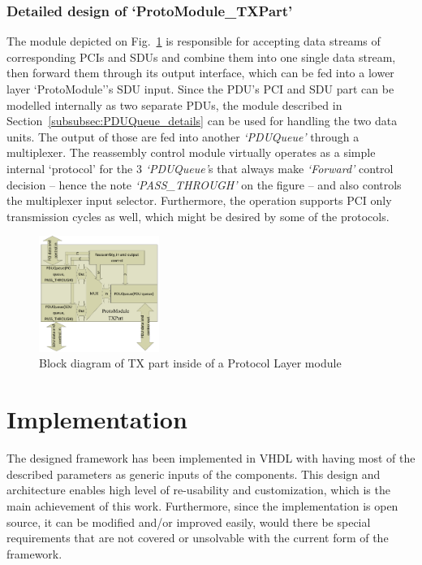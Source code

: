 \documentclass[journal]{IEEEtran}
\begin{document}
\subsubsection{Detailed design of `ProtoModule\_TXPart'}

The module depicted on Fig.~\ref{fig:proto_layer_tx_sch} is responsible for accepting data streams of corresponding
PCIs and SDUs and combine them into one single data stream, then forward them through its output interface, which can
be fed into a lower layer `ProtoModule''s SDU input. Since the PDU's PCI and SDU part can be modelled internally as two
separate PDUs, the module described in Section~\ref{subsubsec:PDUQueue_details} can be used for handling the two data
units.
The output of those are fed into another \emph{`PDUQueue'} through a multiplexer. The reassembly control module
virtually operates as a simple internal `protocol' for the 3 \emph{`PDUQueue'}s that always make \emph{`Forward'}
control decision -- hence the note \emph{`PASS\_THROUGH'} on the figure -- and also controls the multiplexer input
selector. Furthermore, the operation supports PCI only transmission cycles as well, which might be desired by some of
the protocols.
\begin{figure}[!htb]
    \centering
    \includegraphics[width=0.35\textwidth]{figures_raw/proto_tx_part_imp.pdf}
    \caption{Block diagram of TX part inside of a Protocol Layer module}
    \label{fig:proto_layer_tx_sch}
\end{figure}

\section{Implementation}\label{sec:Implementation}

The designed framework has been implemented in VHDL with having most of the described parameters as generic inputs of
the components. This design and architecture enables high level of re-usability and customization, which is the main
achievement of this work. Furthermore, since the implementation is open source, it can be modified and/or improved
easily, would there be special requirements that are not covered or unsolvable with the current form of the framework.
\end{document}
